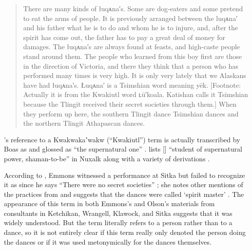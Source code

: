 \begin{quote}\small
There are many kinds of łuqᴀna′s.
Some are dog-eaters and some pretend to eat the arms of people.
It is previously arranged between the luqᴀna′ and his father what he is to do and whom he is to injure, and, after the spirit has come out, the father has to pay a great deal of money for damages.
The łuqᴀna′s are always found at feasts, and high-caste people stand around them.
The people who learned from this boy first are those in the direction of Victoria, and there they think that a person who has performed many times is very high.
It is only very lately that we Alaskans have had łuqᴀna′s.
Łuqᴀna′ is a Tsimshian word meaning yēk. [Footnote: Actually it is from the Kwakiutl word ʟū′koala.
Katishan calls it Tsimshian because the Tlingit received their secret societies through them.] When they perform up here, the southern Tlingit dance Tsimshian dances and the northern Tlingit Athapascan dances.
\end{quote}

\citeauthor{swanton:1908}’s reference to a Kwakwakaʼwakw (“Kwakiutl”) term is actually transcribed by Boas as  and glossed as “the supernatural one” \parencite[693 line 1]{boas-hunt:1897}.
\citeauthor{nater:1990} lists  [] “student of supernatural power, shaman-to-be” in Nuxalk along with a variety of derivations \parencite[64]{nater:1990}.

According to \citeauthor{de-laguna:1972}, Emmons witnessed a performance at Sitka but failed to recognize it as  since he says “There were no secret societies” \parencite[21]{emmons:1991}; she notes other mentions of the practices from \textcite[98–100, 118–121]{olson:1967} and suggests that the dances were called  ‘spirit master’ \parencite[319]{emmons:1991}.
The appearance of this term in both Emmons’s and Olson’s materials from consultants in Ketchikan, Wrangell, Klawock, and Sitka suggests that it was widely understood.
But the term  literally refers to a person rather than to a dance, so it is not entirely clear if this term really only denoted the person doing the dances or if it was used metonymically for the dances themselves.

